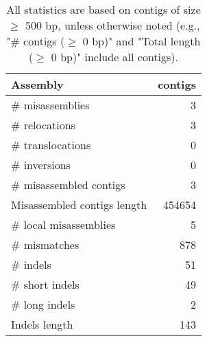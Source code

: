 \documentclass[12pt,a4paper]{article}
\begin{document}
\begin{table}[ht]
\begin{center}
\caption{All statistics are based on contigs of size $\geq$ 500 bp, unless otherwise noted (e.g., "\# contigs ($\geq$ 0 bp)" and "Total length ($\geq$ 0 bp)" include all contigs).}
\begin{tabular}{|l*{1}{|r}|}
\hline
Assembly & contigs \\ \hline
\# misassemblies & 3 \\ \hline
\hspace{5mm}\# relocations & 3 \\ \hline
\hspace{5mm}\# translocations & 0 \\ \hline
\hspace{5mm}\# inversions & 0 \\ \hline
\# misassembled contigs & 3 \\ \hline
Misassembled contigs length & 454654 \\ \hline
\# local misassemblies & 5 \\ \hline
\# mismatches & 878 \\ \hline
\# indels & 51 \\ \hline
\hspace{5mm}\# short indels & 49 \\ \hline
\hspace{5mm}\# long indels & 2 \\ \hline
Indels length & 143 \\ \hline
\end{tabular}
\end{center}
\end{table}
\end{document}
